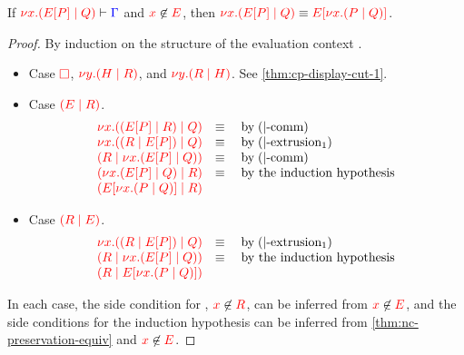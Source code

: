 \begin{lemmaB}\label{thm:nc-display-cut-1}
  If $\seq[{ \tm{\cpCut{x}{\cpPlug{E}{P}}{Q}} }]{ \Gamma }$ and
  $\notFreeIn{x}{E}$, then $\tm{\cpCut{x}{\cpPlug{E}{P}}{Q}} \equiv
  \tm{\cpPlug{E}{\cpCut{x}{P}{Q}}}$.
\end{lemmaB}
\begin{proof}
  By induction on the structure of the evaluation context .
  \begin{itemize}
  \item
    Case $\tm{\Box}$, $\tm{\cpCut{y}{H}{R}}$, and $\tm{\cpCut{y}{R}{H}}$. See \cref{thm:cp-display-cut-1}.
  \item
    Case $\tm{\ncPool{E}{R}}$.
    \[\!
      \begin{array}{ll}
        \tm{\cpCut{x}{\ncPool{\cpPlug{E}{P}}{R}}{Q}} & \equiv \quad \text{by} \; \ncEquivPoolComm \\
        \tm{\cpCut{x}{\ncPool{R}{\cpPlug{E}{P}}}{Q}} & \equiv \quad \text{by} \; \ncRedKappaPool1 \\
        \tm{\ncPool{R}{\cpCut{x}{\cpPlug{E}{P}}{Q}}} & \equiv \quad \text{by} \; \ncEquivPoolComm \\
        \tm{\ncPool{\cpCut{x}{\cpPlug{E}{P}}{Q}}{R}} & \equiv \quad \text{by the induction hypothesis}\\
        \tm{\ncPool{\cpPlug{E}{\cpCut{x}{P}{Q}}}{R}} &
      \end{array}
    \]
  \item
    Case $\tm{\ncPool{R}{E}}$.
    \[\!
      \begin{array}{ll}
        \tm{\cpCut{x}{\ncPool{R}{\cpPlug{E}{P}}}{Q}} & \equiv \quad \text{by} \; \ncRedKappaPool1 \\
        \tm{\ncPool{R}{\cpCut{x}{\cpPlug{E}{P}}{Q}}} & \equiv \quad \text{by the induction hypothesis}\\
        \tm{\ncPool{R}{\cpPlug{E}{\cpCut{x}{P}{Q}}}} &
      \end{array}
    \]
  \end{itemize}
  In each case, the side condition for , $\notFreeIn{x}{R}$, can
  be inferred from $\notFreeIn{x}{E}$, and the side conditions for the induction
  hypothesis can be inferred from \cref{thm:nc-preservation-equiv} and
  $\notFreeIn{x}{E}$.
\end{proof}
